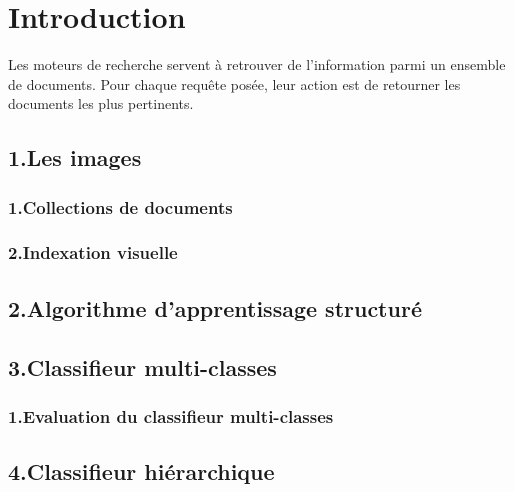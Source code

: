 \documentclass[a4paper,11pt]{report}
\begin{document}
\chapter*{{\centering Introduction}}
Les moteurs de recherche servent à retrouver de l'information parmi un ensemble de documents. Pour chaque requête posée, leur action est de retourner les documents les plus pertinents. 

\section*{1.Les images}

\subsection*{1.Collections de documents}

\subsection*{2.Indexation visuelle}

\section*{2.Algorithme d'apprentissage structuré}




\section*{3.Classifieur multi-classes}

\subsection*{1.Evaluation du classifieur multi-classes}

\section*{4.Classifieur hiérarchique}
\end{document}
